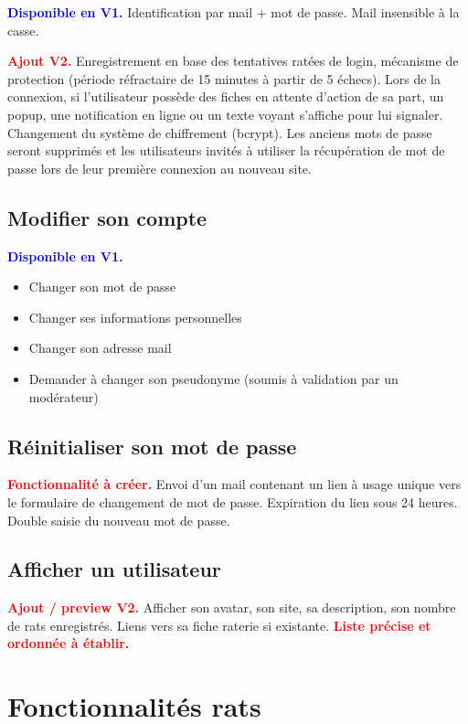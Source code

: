 \documentclass[a4paper,10pt]{article}
\newcommand\existant[1]{\noindent\textbf{\textcolor{blue}{#1}}}
\newcommand\desire[1]{\noindent\textbf{\textcolor{red}{#1}}}
\begin{document}
\existant{Disponible en V1.} Identification par mail + mot de passe. Mail insensible à la casse.

\desire{Ajout V2.} Enregistrement en base des tentatives ratées de login, mécanisme de protection (période réfractaire de 15 minutes à partir de 5 échecs). Lors de la connexion, si l'utilisateur possède des fiches en attente d'action de sa part, un popup, une notification en ligne ou un texte voyant s'affiche pour lui signaler. Changement du système de chiffrement (bcrypt). Les anciens mots de passe seront supprimés et les utilisateurs invités à utiliser la récupération de mot de passe lors de leur première connexion au nouveau site.

\subsection{Modifier son compte}

\existant{Disponible en V1.}
\begin{itemize}
\item Changer son mot de passe
\item Changer ses informations personnelles 
\item Changer son adresse mail
\item Demander à changer son pseudonyme (soumis à validation par un modérateur)
\end{itemize}

\subsection{Réinitialiser son mot de passe}
\desire{Fonctionnalité à créer.} Envoi d'un mail contenant un lien à usage unique vers le formulaire de changement de mot de passe. Expiration du lien sous 24 heures. Double saisie du nouveau mot de passe.

\subsection{Afficher un utilisateur}

\desire{Ajout / preview V2.} Afficher son avatar, son site, sa description, son nombre de rats enregistrés. Liens vers sa fiche raterie si existante. \desire{Liste précise et ordonnée à établir.}

\section{Fonctionnalités rats}
\end{document}
